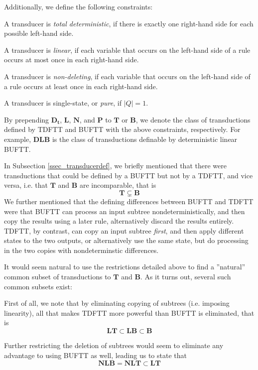 Additionally, we define the following constraints:
\begin{compactitem}
\item A transducer is \emph{total deterministic}, if there is exactly one
right-hand side for each possible left-hand side. %
\item A transducer is \emph{linear}, if each variable that occurs on the
left-hand side of a rule occurs at most once in each right-hand side. 
\item A transducer is \emph{non-deleting}, if each variable that occurs on
the left-hand side of a rule occurs at least once in each right-hand side.
\item A transducer is single-state, or \emph{pure}, if $|Q| = 1$.
\end{compactitem}

By prepending $\mathbf{D_t}$, $\mathbf{L}$, $\mathbf{N}$, and $\mathbf{P}$
to $\mathbf{T}$ or $\mathbf{B}$, we denote the class of transductions
defined by TDFTT and BUFTT with the above constraints, respectively. For
example, $\mathbf{DLB}$ is the class of transductions definable by
deterministic linear BUFTT. 

In Subsection \ref{ssec_transducerdef}, we briefly mentioned that there
were transductions that could be defined by a BUFTT but not by a TDFTT, and
vice versa, i.e. that $\mathbf{T}$ and $\mathbf{B}$ are incomparable, that
is
$$\mathbf{T} \subsetneq \mathbf{B}$$
We further mentioned that the defining differences between BUFTT and TDFTT
were that BUFTT can process an input subtree nondeterministically, and then
copy the results using a later rule, alternatively discard the results
entirely.  TDFTT, by contrast, can copy an input subtree \emph{first}, and
then apply different states to the two outputs, or alternatively use the
same state, but do processing in the two copies with nondeterminstic
differences.

It would seem natural to use the restrictions detailed above to find a
''natural'' common subset of transductions to $\mathbf{T}$ and
$\mathbf{B}$. As it turns out, several such common subsets exist:

First of all, we note that by eliminating copying of subtrees (i.e.
imposing linearity), all that makes TDFTT more powerful than BUFTT is
eliminated, that is
$$\mathbf{LT} \subset \mathbf{LB} \subset \mathbf{B}$$

Further restricting the deletion of subtrees would seem to eliminate any
advantage to using BUFTT as well, leading us to state that
$$\mathbf{NLB} = \mathbf{NLT} \subset \mathbf{LT}$$

